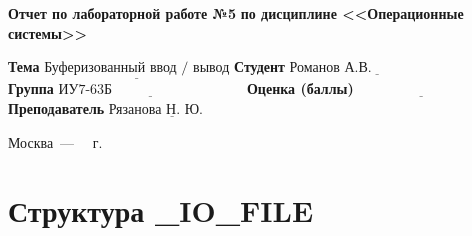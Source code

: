 \documentclass[12pt]{report}
\begin{document}
\begin{titlepage}
		\begin{center}
			\noindent\begin{minipage}{1.1\textwidth}\centering
				\Large\textbf{  Отчет по лабораторной работе №5}\newline
				\textbf{по дисциплине <<Операционные системы>>}\newline\newline\newline
			\end{minipage}
		\end{center}
		
		\noindent\textbf{Тема} $\underline{\text{Буферизованный ввод / вывод}}$\newline\newline
		\noindent\textbf{Студент} $\underline{\text{Романов А.В.~~~~~~~~~~~~~~~~~~~~}}$\newline\newline
		\noindent\textbf{Группа} $\underline{\text{ИУ7-63Б~~~~~~~~~~~~~~~~~~~~~~~~~~~~}}$\newline\newline
		\noindent\textbf{Оценка (баллы)} $\underline{\text{~~~~~~~~~~~~~~~~~~~~~~~~~~~}}$\newline\newline
		\noindent\textbf{Преподаватель} $\underline{\text{Рязанова Н. Ю.~~~~~~~}}$\newline\newline\newline
		
		\begin{center}
			\vfill
			Москва~---~\the\year
			~г.
		\end{center}
	\end{titlepage}


\chapter{Структура \_IO\_FILE}
\end{document}
